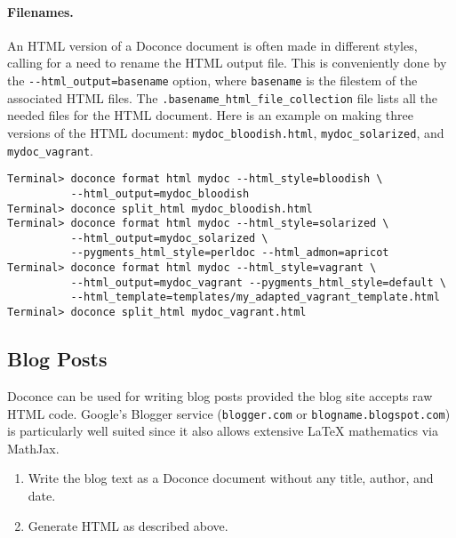 \documentclass[%
oneside,                 %
final,                   %
10pt]{article}
\begin{document}
{{{\paragraph{Filenames.}
An HTML version of a Doconce document is often made in different styles,
calling for a need to rename the HTML output file. This is conveniently
done by the {\fontsize{10pt}{10pt}\Verb!--html_output=basename!} option, where {\fontsize{10pt}{10pt}\Verb!basename!} is the
filestem of the associated HTML files. The
{\fontsize{10pt}{10pt}\Verb!.basename_html_file_collection!} file lists all the needed files
for the HTML document. Here is an example on making three versions of
the HTML document: {\fontsize{10pt}{10pt}\Verb!mydoc_bloodish.html!}, {\fontsize{10pt}{10pt}\Verb!mydoc_solarized!}, and
{\fontsize{10pt}{10pt}\Verb!mydoc_vagrant!}.

\vspace{4pt}
\begin{Verbatim}[numbers=none,frame=lines,fontsize=\fontsize{9pt}{9pt},labelposition=topline,framesep=2.5mm,framerule=0.7pt]
Terminal> doconce format html mydoc --html_style=bloodish \ 
          --html_output=mydoc_bloodish
Terminal> doconce split_html mydoc_bloodish.html
Terminal> doconce format html mydoc --html_style=solarized \ 
          --html_output=mydoc_solarized \ 
          --pygments_html_style=perldoc --html_admon=apricot
Terminal> doconce format html mydoc --html_style=vagrant \ 
          --html_output=mydoc_vagrant --pygments_html_style=default \ 
          --html_template=templates/my_adapted_vagrant_template.html
Terminal> doconce split_html mydoc_vagrant.html
\end{Verbatim}

\subsection{Blog Posts}

Doconce can be used for writing blog posts provided the blog site accepts
raw HTML code. Google's Blogger service ({\fontsize{10pt}{10pt}\Verb!blogger.com!} or
{\fontsize{10pt}{10pt}\Verb!blogname.blogspot.com!}) is particularly well suited since it also
allows extensive {\LaTeX} mathematics via MathJax.

\begin{enumerate}
\item Write the blog text as a Doconce document without any
   title, author, and date.

\item Generate HTML as described above.


\end{enumerate}}}}
\end{document}
